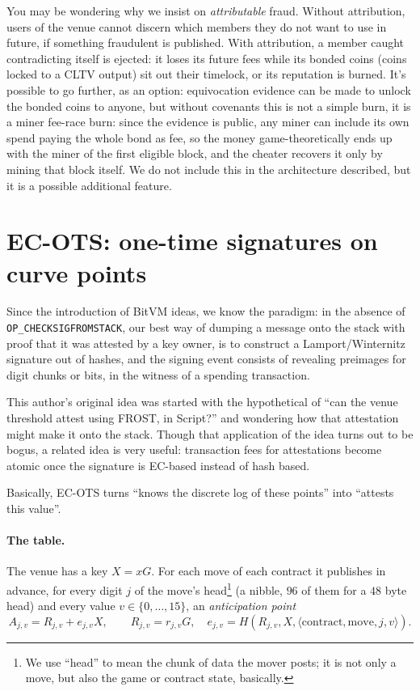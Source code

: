 \documentclass[11pt]{article}
\newcommand{\op}[1]{\texttt{OP\_#1}}
\begin{document}
You may be wondering why we insist on \emph{attributable} fraud. Without attribution, users of the venue cannot discern which members they do not want to use in future, if something fraudulent is published. With attribution, a member caught contradicting itself is ejected: it loses its future fees while its bonded coins (coins locked to a CLTV output) sit out their timelock, or its reputation is burned. It's possible to go further, as an option: equivocation evidence can be made to unlock the bonded coins to anyone, but without covenants this is not a simple burn, it is a miner fee-race burn: since the evidence is public, any miner can include its own spend paying the whole bond as fee, so the money game-theoretically ends up with the miner of the first eligible block, and the cheater recovers it only by mining that block itself. We do not include this in the architecture described, but it is a possible additional feature.

\section{EC-OTS: one-time signatures on curve points}
\label{sec:ecots}

Since the introduction of BitVM ideas, we know the paradigm: in the absence of \op{CHECKSIGFROMSTACK}, our best way of dumping a message onto the stack with proof that it was attested by a key owner, is to construct a Lamport/Winternitz signature out of hashes, and the signing event consists of revealing preimages for digit chunks or bits, in the witness of a spending transaction.

This author's original idea was started with the hypothetical of ``can the venue threshold attest using FROST, in Script?'' and wondering how that attestation might make it onto the stack. Though that application of the idea turns out to be bogus, a related idea is very useful: transaction fees for attestations become atomic once the signature is EC-based instead of hash based.

Basically, EC-OTS turns ``knows the discrete log of these points'' into ``attests this value''.

\paragraph{The table.} The venue has a key $X = xG$. For each move of each contract it publishes in advance, for every digit $j$ of the move's head\footnote{We use ``head'' to mean the chunk of data the mover posts; it is not only a move, but also the game or contract state, basically.} (a nibble, $96$ of them for a $48$ byte head) and every value $v \in \{0,\dots,15\}$, an \emph{anticipation point}
\[
A_{j,v} = R_{j,v} + e_{j,v}X, \qquad R_{j,v} = r_{j,v}G, \quad e_{j,v} = H(R_{j,v}, X, \langle\text{contract}, \text{move}, j, v\rangle).
\]
\end{document}
